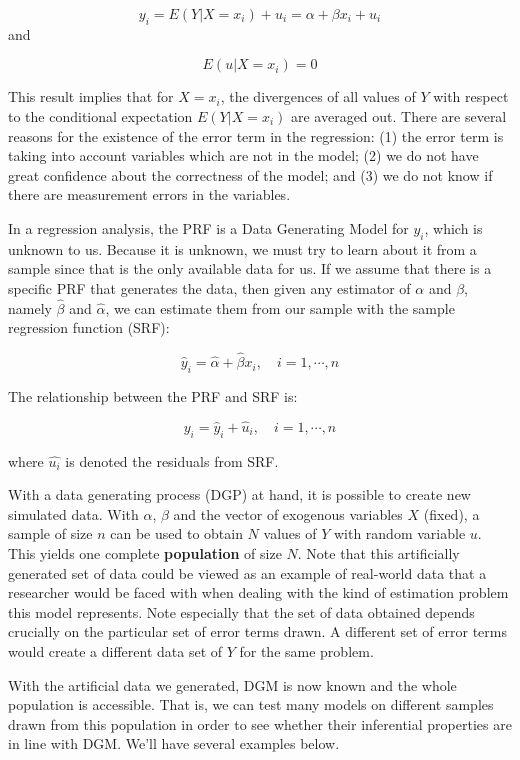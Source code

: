 \documentclass[
]{book}
\theoremstyle{definition}
\theoremstyle{definition}
\theoremstyle{definition}
\theoremstyle{definition}
\theoremstyle{remark}
\begin{document}
\[
y_{i}=E\left(Y | X=x_{i}\right)+u_{i}=\alpha+\beta x_{i}+u_{i}
\]
and

\[
E\left(u | X=x_{i}\right)=0
\]

This result implies that for \(X=x_i\), the divergences of all values of \(Y\) with respect to the conditional expectation \(E(Y\vert X=x_i)\) are averaged out. There are several reasons for the existence of the error term in the regression: (1) the error term is taking into account variables which are not in the model; (2) we do not have great confidence about the correctness of the model; and (3) we do not know if there are measurement errors in the variables.

In a regression analysis, the PRF is a Data Generating Model for \(y_i\), which is unknown to us. Because it is unknown, we must try to learn about it from a sample since that is the only available data for us. If we assume that there is a specific PRF that generates the data, then given any estimator of \(\alpha\) and \(\beta\), namely \(\hat{\beta}\) and \(\hat{\alpha}\), we can estimate them from our sample with the sample regression function (SRF):

\[
\hat{y}_{i}=\hat{\alpha}+\hat{\beta} x_{i}, \quad i=1, \cdots, n
\]

The relationship between the PRF and SRF is:

\[
y_{i}=\hat{y}_{i}+\hat{u}_{i}, \quad i=1, \cdots, n
\]

where \(\hat{u_i}\) is denoted the residuals from SRF.

With a data generating process (DGP) at hand, it is possible to create new simulated data. With \(\alpha\), \(\beta\) and the vector of exogenous variables \(X\) (fixed), a sample of size \(n\) can be used to obtain \(N\) values of \(Y\) with random variable \(u\). This yields one complete \textbf{population} of size \(N\). Note that this artificially generated set of data could be viewed as an example of real-world data that a researcher would be faced with when dealing with the kind of estimation problem this model represents. Note especially that the set of data obtained depends crucially on the particular set of error terms drawn. A different set of error terms would create a different data set of \(Y\) for the same problem.

With the artificial data we generated, DGM is now known and the whole population is accessible. That is, we can test many models on different samples drawn from this population in order to see whether their inferential properties are in line with DGM. We'll have several examples below.
\end{document}
